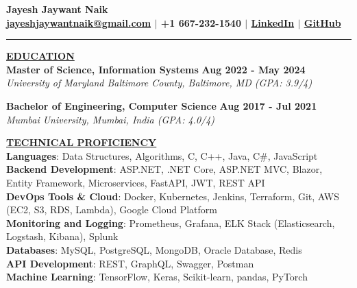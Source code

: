 \documentclass{article}
\begin{document}
\begin{center}
\thispagestyle{empty}
\large \textbf{Jayesh Jaywant Naik \\}
\normalsize \textbf{\href{mailto:jayeshjaywantnaik@gmail.com}{jayeshjaywantnaik@gmail.com} $\mid$ +1 667-232-1540 $\mid$ \href{https://www.linkedin.com/in/jayeshjnaik}{LinkedIn} $\mid$ \href{https://github.com/jayeshjnaik}{GitHub} \\}
\rule{\textwidth}{1pt}
\end{center}

\noindent \textbf{\underline{EDUCATION}} \\
\textbf{Master of Science, Information Systems } \hfill \textbf{Aug 2022 - May 2024} \\
\textit{University of Maryland Baltimore County, Baltimore, MD (GPA: 3.9/4)}  
\begin{itemize}[noitemsep,nolistsep,leftmargin=*]
\end{itemize}
\begin{itemize}
\end{itemize}
\textbf{Bachelor of Engineering, Computer Science} \hfill \textbf{Aug 2017 - Jul 2021} \\
\textit{Mumbai University, Mumbai, India (GPA: 4.0/4)}\\
\begin{itemize}[noitemsep,nolistsep,leftmargin=*]
\end{itemize}


\noindent \textbf{\underline{TECHNICAL PROFICIENCY}} \\
\textbf{Languages}{: \small Data Structures, Algorithms, C, C++, Java, C\#, JavaScript} \\
\textbf{Backend Development}{: \small ASP.NET, .NET Core, ASP.NET MVC, Blazor, Entity Framework, Microservices, FastAPI, JWT, REST API} \\
\textbf{DevOps Tools \& Cloud}{: \small Docker, Kubernetes, Jenkins, Terraform, Git, AWS (EC2, S3, RDS, Lambda), Google Cloud Platform} \\
\textbf{Monitoring and Logging}{: \small Prometheus, Grafana, ELK Stack (Elasticsearch, Logstash, Kibana), Splunk} \\
\textbf{Databases}{: \small MySQL, PostgreSQL, MongoDB, Oracle Database, Redis} \\
\textbf{API Development}{: \small REST, GraphQL, Swagger, Postman} \\
\textbf{Machine Learning}{: \small TensorFlow, Keras, Scikit-learn, pandas, PyTorch} \\
\end{document}
